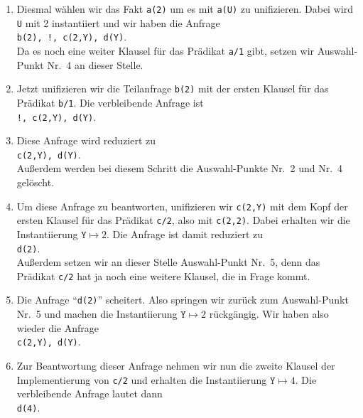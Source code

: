\begin{enumerate}
\item Diesmal wählen wir das Fakt \texttt{a(2)} um es mit \texttt{a(U)} zu unifizieren.  Dabei wird \texttt{U} mit
      2 instantiiert und wir haben die  Anfrage \\[0.1cm]
      \hspace*{1.3cm} \texttt{b(2), !, c(2,Y), d(Y)}. \\[0.1cm]
      Da es noch eine weiter Klausel für das Prädikat \texttt{a/1} gibt, setzen wir 
      Auswahl-Punkt Nr.~4 an dieser Stelle.
\item Jetzt unifizieren wir  die Teilanfrage \texttt{b(2)} mit der ersten Klausel für das Prädikat
      \texttt{b/1}.  Die verbleibende Anfrage ist \\[0.1cm]
      \hspace*{1.3cm} \texttt{!, c(2,Y), d(Y)}. 
\item Diese Anfrage wird reduziert zu \\[0.1cm]
      \hspace*{1.3cm}  \texttt{c(2,Y), d(Y)}. \\[0.1cm]
      Außerdem werden bei diesem Schritt die Auswahl-Punkte Nr.~2 und Nr.~4 gelöscht.
\item Um diese Anfrage zu beantworten, unifizieren wir \texttt{c(2,Y)} mit dem Kopf der
      ersten Klausel für das Prädikat \texttt{c/2}, also mit \texttt{c(2,2)}.
      Dabei erhalten wir die Instantiierung
      $\mathtt{Y} \mapsto 2$.  Die Anfrage ist damit reduziert zu \\[0.1cm]
      \hspace*{1.3cm}  \texttt{d(2)}. \\[0.1cm]
      Außerdem setzen wir an dieser Stelle Auswahl-Punkt Nr.~5, denn das Prädikat
      \texttt{c/2} hat ja noch eine weitere Klausel, die in Frage kommt.
\item Die Anfrage ``\texttt{d(2)}'' scheitert.  Also springen wir zurück zum Auswahl-Punkt
      Nr.~5 und machen die Instantiierung $\mathtt{Y} \mapsto 2$ rückgängig.  Wir haben
      also wieder die Anfrage \\[0.1cm]
      \hspace*{1.3cm}  \texttt{c(2,Y), d(Y)}. 
\item Zur Beantwortung dieser Anfrage nehmen wir nun die zweite Klausel der
      Implementierung von \texttt{c/2} und erhalten die Instantiierung 
      $\mathtt{Y} \mapsto 4$.  Die verbleibende Anfrage lautet dann \\[0.1cm]
      \hspace*{1.3cm} \texttt{d(4)}.

\end{enumerate}
